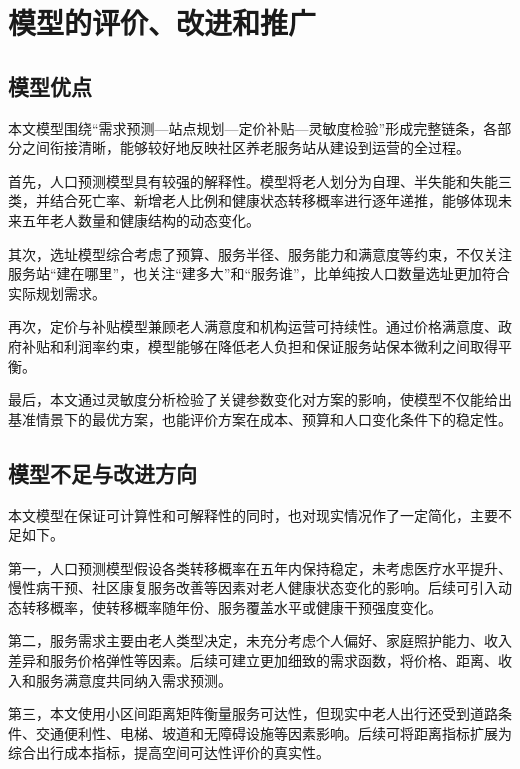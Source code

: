 \documentclass[UTF8]{ctexart}
\begin{document}






\section{模型的评价、改进和推广}

\subsection{模型优点}

本文模型围绕“需求预测—站点规划—定价补贴—灵敏度检验”形成完整链条，各部分之间衔接清晰，能够较好地反映社区养老服务站从建设到运营的全过程。

首先，人口预测模型具有较强的解释性。模型将老人划分为自理、半失能和失能三类，并结合死亡率、新增老人比例和健康状态转移概率进行逐年递推，能够体现未来五年老人数量和健康结构的动态变化。

其次，选址模型综合考虑了预算、服务半径、服务能力和满意度等约束，不仅关注服务站“建在哪里”，也关注“建多大”和“服务谁”，比单纯按人口数量选址更加符合实际规划需求。

再次，定价与补贴模型兼顾老人满意度和机构运营可持续性。通过价格满意度、政府补贴和利润率约束，模型能够在降低老人负担和保证服务站保本微利之间取得平衡。

最后，本文通过灵敏度分析检验了关键参数变化对方案的影响，使模型不仅能给出基准情景下的最优方案，也能评价方案在成本、预算和人口变化条件下的稳定性。

\subsection{模型不足与改进方向}

本文模型在保证可计算性和可解释性的同时，也对现实情况作了一定简化，主要不足如下。

第一，人口预测模型假设各类转移概率在五年内保持稳定，未考虑医疗水平提升、慢性病干预、社区康复服务改善等因素对老人健康状态变化的影响。后续可引入动态转移概率，使转移概率随年份、服务覆盖水平或健康干预强度变化。

第二，服务需求主要由老人类型决定，未充分考虑个人偏好、家庭照护能力、收入差异和服务价格弹性等因素。后续可建立更加细致的需求函数，将价格、距离、收入和服务满意度共同纳入需求预测。

第三，本文使用小区间距离矩阵衡量服务可达性，但现实中老人出行还受到道路条件、交通便利性、电梯、坡道和无障碍设施等因素影响。后续可将距离指标扩展为综合出行成本指标，提高空间可达性评价的真实性。
\end{document}
